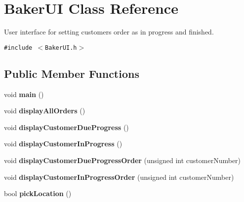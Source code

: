 \hypertarget{class_baker_u_i}{
\section{Baker\-UI Class Reference}
\label{class_baker_u_i}
}
User interface for setting customers order as in progress and finished.  


{\tt \#include $<$Baker\-UI.h$>$}

\subsection*{Public Member Functions}
\begin{CompactItemize}
\item 
\hypertarget{class_baker_u_i_ea83b916b3f52eec32ae6d54d59b4453}{
void {\bf main} ()}
\label{class_baker_u_i_ea83b916b3f52eec32ae6d54d59b4453}

\item 
\hypertarget{class_baker_u_i_d69822b9289cd53fa4da8f4f39864d19}{
void {\bf display\-All\-Orders} ()}
\label{class_baker_u_i_d69822b9289cd53fa4da8f4f39864d19}

\item 
\hypertarget{class_baker_u_i_00eeac47a993278134a2d8ba936f6f31}{
void {\bf display\-Customer\-Due\-Progress} ()}
\label{class_baker_u_i_00eeac47a993278134a2d8ba936f6f31}

\item 
\hypertarget{class_baker_u_i_49612691d8a1c466378d3e4507aff847}{
void {\bf display\-Customer\-In\-Progress} ()}
\label{class_baker_u_i_49612691d8a1c466378d3e4507aff847}

\item 
\hypertarget{class_baker_u_i_9afa245c6153335e553d88f8e7ad2c2e}{
void {\bf display\-Customer\-Due\-Progress\-Order} (unsigned int customer\-Number)}
\label{class_baker_u_i_9afa245c6153335e553d88f8e7ad2c2e}

\item 
\hypertarget{class_baker_u_i_12edcb5c93a8a60d06b8c9de906c4be0}{
void {\bf display\-Customer\-In\-Progress\-Order} (unsigned int customer\-Number)}
\label{class_baker_u_i_12edcb5c93a8a60d06b8c9de906c4be0}

\item 
\hypertarget{class_baker_u_i_74d0d6b7d7493e8a9703bc8fbeb79f2e}{
bool {\bf pick\-Location} ()}
\label{class_baker_u_i_74d0d6b7d7493e8a9703bc8fbeb79f2e}

\end{CompactItemize}
